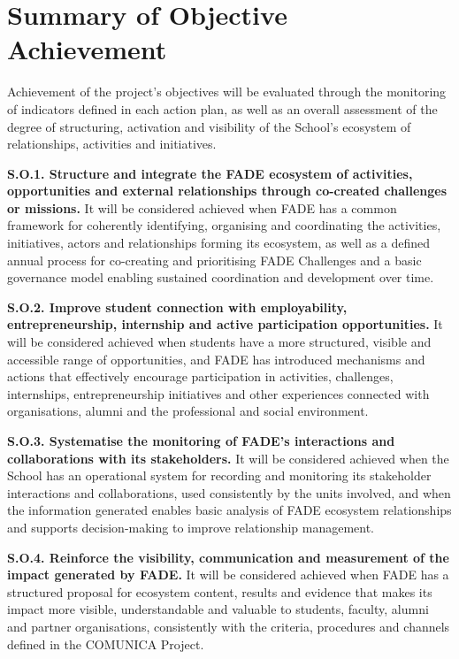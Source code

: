 \documentclass[11pt,a4paper]{scrreprt}
\begin{document}
\section{Summary of Objective Achievement}

\small
Achievement of the project's objectives will be evaluated through the monitoring of indicators defined in each action plan, as well as an overall assessment of the degree of structuring, activation and visibility of the School's ecosystem of relationships, activities and initiatives.

\textbf{S.O.1. Structure and integrate the FADE ecosystem of activities, opportunities and external relationships through co-created challenges or missions.} It will be considered achieved when FADE has a common framework for coherently identifying, organising and coordinating the activities, initiatives, actors and relationships forming its ecosystem, as well as a defined annual process for co-creating and prioritising FADE Challenges and a basic governance model enabling sustained coordination and development over time.

\textbf{S.O.2. Improve student connection with employability, entrepreneurship, internship and active participation opportunities.} It will be considered achieved when students have a more structured, visible and accessible range of opportunities, and FADE has introduced mechanisms and actions that effectively encourage participation in activities, challenges, internships, entrepreneurship initiatives and other experiences connected with organisations, alumni and the professional and social environment.

\textbf{S.O.3. Systematise the monitoring of FADE's interactions and collaborations with its stakeholders.} It will be considered achieved when the School has an operational system for recording and monitoring its stakeholder interactions and collaborations, used consistently by the units involved, and when the information generated enables basic analysis of FADE ecosystem relationships and supports decision-making to improve relationship management.

\textbf{S.O.4. Reinforce the visibility, communication and measurement of the impact generated by FADE.} It will be considered achieved when FADE has a structured proposal for ecosystem content, results and evidence that makes its impact more visible, understandable and valuable to students, faculty, alumni and partner organisations, consistently with the criteria, procedures and channels defined in the COMUNICA Project.
\end{document}
